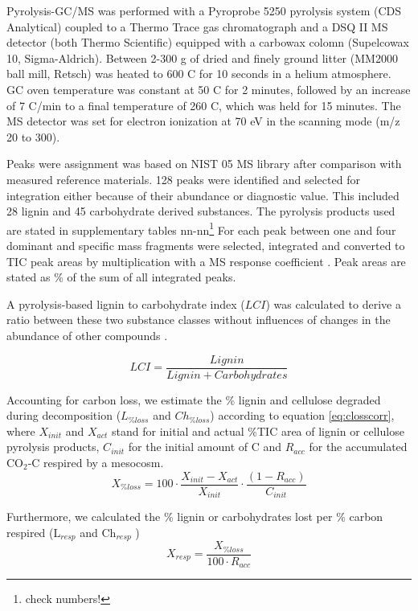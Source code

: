 Pyrolysis-GC/MS was performed with a Pyroprobe 5250 pyrolysis system (CDS Analytical) coupled to a Thermo Trace gas chromatograph and a DSQ II MS detector (both Thermo Scientific) equipped with a carbowax colomn (Supelcowax 10, Sigma-Aldrich). Between 2-300 \textmu g of dried and finely ground litter (MM2000 ball mill, Retsch) was heated to 600 \textdegree C for 10 seconds in a helium atmosphere. GC oven temperature was constant at 50 \textdegree C for 2 minutes, followed by an increase of 7 \textdegree C/min to a final temperature of 260 \textdegree C, which was held for 15 minutes. The MS detector was set for electron ionization at 70 eV in the scanning mode (m/z 20 to 300).

Peaks were assignment was based on NIST 05 MS library after comparison with measured reference materials. 128 peaks were identified and selected for integration either because of their abundance or diagnostic value. This included 28 lignin and 45 carbohydrate derived substances. The pyrolysis products used are stated in supplementary tables nn-nn\footnote{check numbers!} For each peak between one and four dominant and specific mass fragments were selected, integrated and converted to TIC peak areas by multiplication with a MS response coefficient \cite{Schellekens2009, Kuder1998}. Peak areas are stated as \% of the sum of all integrated peaks.

A pyrolysis-based lignin to carbohydrate index ($LCI$) was calculated to derive a ratio between these two substance classes without influences of changes in the abundance of other compounds . 

\begin{equation}
 LCI=\frac{Lignin}{Lignin + Carbohydrates}
\end{equation}

Accounting for carbon loss, we estimate the \% lignin and cellulose degraded during decomposition ($L_{\% loss}$ and $Ch_{\% loss}$)  according to equation \ref{eq:closscorr}, where \emph{$X_{init}$} and \emph{$X_{act}$} stand for initial and actual \%TIC area of lignin or cellulose pyrolysis products, \emph{$C_{init}$} for the initial amount of C and \emph{$R_{acc}$} for the accumulated CO$_2$-C respired by a mesocosm.
\begin{equation}
 X_{\% loss} = 100\cdot\frac{X_{init}-X_{act}}{X_{init}}\cdot\frac{\left ( 1-R_{acc}\right ) }{C_{init}}
 \label{eq:closscorr}
\end{equation}

Furthermore, we calculated the \% lignin or carbohydrates lost per \% carbon respired (L$_{resp}$ and Ch$_{resp}$ )
\begin{equation}
 X_{resp} = \frac{X_{\% loss}}{100 \cdot R_{acc}}
 \label{eq:respcorr}
\end{equation}

